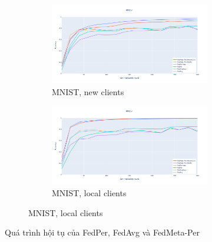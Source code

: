 \begin{figure}
    \begin{subfigure}{\textwidth}
        \centering
        \begin{subfigure}{.5\textwidth}
            \centering
            \includegraphics[width=\linewidth]{./tab_img/mnist_per_new.png}
            \caption{MNIST, new clients}
            \label{fig:mnist_per_new}
        \end{subfigure}%
        \begin{subfigure}{.5\textwidth}
            \centering
            \includegraphics[width=\linewidth]{./tab_img/mnist_per_old.png}
            \caption{MNIST, local clients}
            \label{fig:mnist_per_old}
        \end{subfigure}
    \end{subfigure}
    \caption{Quá trình hội tụ của FedPer, FedAvg và FedMeta-Per}
    \label{fig:fedper_acc}
\end{figure}

